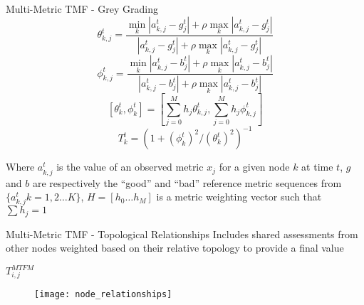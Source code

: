 \documentclass[aspectratio=43]{beamer}
\begin{document}
\begin{frame}{Multi-Metric TMF - Grey Grading} 
  \begin{equation}
    \label{eq:grcg}
    \theta_{k,j}^t = \frac{\min_k|a_{k,j}^t - g_j^t| + \rho \max_k|a_{k,j}^t-g_j^t|}{|a_{k,j}^t-g_j^t| + \rho \max_k|a_{k,j}^t-g_j^t|} 
  \end{equation}
  \begin{equation}
    \label{eq:grcb}
    \phi_{k,j}^t = \frac{\min_k|a_{k,j}^t - b_j^t| + \rho \max_k|a_{k,j}^t-b_j^t|}{|a_{k,j}^t-b_j^t| + \rho \max_k|a_{k,j}^t-b_j^t|} 
  \end{equation}
  \begin{equation}
    \label{eq:grc}
    [\theta_k^t, \phi_k^t] = \left[\sum_{j=0}^M h_j \theta_{k,j}^t,\sum_{j=0}^M h_j \phi_{k,j}^t \right]
  \end{equation}
  \begin{equation}
    \label{eq:grcT}
    T_k^t = ({1+{(\phi_k^t)^2}/{(\theta_k^t)^2}})^{-1}
  \end{equation}

  Where  $a_{k,j}^t$ is the value of an observed metric $x_j$ for a given node $k$ at time $t$,  $g$ and $b$ are respectively the ``good'' and ``bad'' reference metric sequences from $\{a_{k,j}^t k=1,2\dots K\}$, $H=[h_0\dots h_M]$ is a metric weighting vector such that $\sum h_j = 1$

\end{frame}
\begin{frame}{Multi-Metric TMF - Topological Relationships} 
  \centering
  Includes shared assessments from other nodes weighted based on their relative topology to provide a final value\footnotemark  

  \vspace{9pt}

  $T_{i,j}^{MTFM}$
  \begin{figure}[h]
    \centering
    \texttt{[image: node\_relationships]}
    \label{fig:node_relationships}
  \end{figure}

\end{frame}
\end{document}
